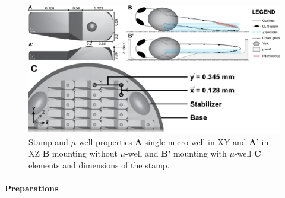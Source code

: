 \documentclass[11pt,singlespacinge,twoside]{reedthesis} %
\begin{document}
\begin{figure}

{\centering \includegraphics[width=0.8\linewidth]{figure/02-MaMo/Mount/mountmicro} 

}

\caption[Stamp and micro-well properties]{Stamp and \(\mu\)-well properties \textbf{A} single micro well in XY and \textbf{A'} in XZ \textbf{B} mounting without \(\mu\)-well and \textbf{B'} mounting with \(\mu\)-well \textbf{C} elements and dimensions of the stamp.}\label{fig:Mountmicro}
\end{figure}
\hypertarget{preparations}{%
\paragraph{Preparations}\label{preparations}}
\end{document}
